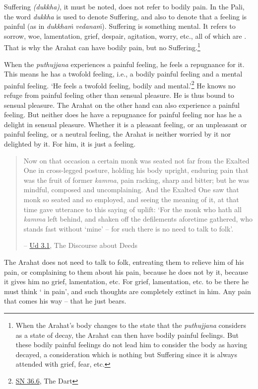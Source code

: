 Suffering \emph{(dukkha)}, it must be noted, does not refer to bodily pain. In the Pali, the word \emph{dukkha} is used to denote Suffering, and also to denote that a feeling is painful (as in \emph{dukkhaṁ vedanaṁ}). Suffering is something mental. It refers to sorrow, woe, lamentation, grief, despair, agitation, worry, etc., all of which are . That is why the Arahat can have bodily pain, but no Suffering.\footnote{When the Arahat's body changes to the state that the \emph{puthujjana} considers as a state of decay, the Arahat can then have bodily painful feelings. But these bodily painful feelings do not lead him to consider the body as having decayed, a consideration which is nothing but Suffering since it is always attended with grief, fear, etc.}

When the \emph{puthujjana} experiences a painful feeling, he feels a repugnance for it. This means he has a twofold feeling, i.e., a bodily painful feeling and a mental painful feeling. `He feels a twofold feeling, bodily and mental.'\footnote{\href{https://suttacentral.net/sn36.6/en/bodhi}{SN 36.6}, The Dart} He knows no refuge from painful feeling other than sensual pleasure. He is thus bound to sensual pleasure. The Arahat on the other hand can also experience a painful feeling. But neither does he have a repugnance for painful feeling nor has he a delight in sensual pleasure. Whether it is a pleasant feeling, or an unpleasant or painful feeling, or a neutral feeling, the Arahat is neither worried by it nor delighted by it. For him, it is just a feeling.

\begin{quote}
Now on that occasion a certain monk was seated not far from the Exalted One in cross-legged posture, holding his body upright, enduring pain that was the fruit of former \emph{kamma}, pain racking, sharp and bitter; but he was mindful, composed and uncomplaining. And the Exalted One saw that monk so seated and so employed, and seeing the meaning of it, at that time gave utterance to this saying of uplift: `For the monk who hath all \emph{kamma} left behind, and shaken off the defilements aforetime gathered, who stands fast without `mine' -- for such there is no need to talk to folk'.

 -- \href{https://suttacentral.net/ud3.1/en/anandajoti}{Ud 3.1}, The Discourse about Deeds
\end{quote}

The Arahat does not need to talk to folk, entreating them to relieve him of his pain, or complaining to them about his pain, because he does not  by it, because it gives him no grief, lamentation, etc. For grief, lamentation, etc. to be there he must think ` in pain', and such thoughts are completely extinct in him. Any pain that comes his way -- that he just bears.

